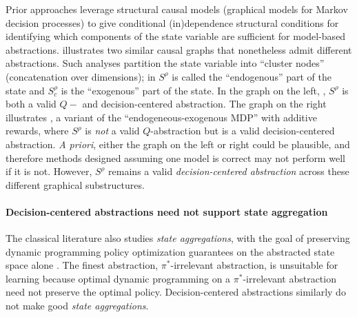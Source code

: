 \documentclass[opre,nonblindrev]{informs4}
\newenvironment{revision}{\begingroup\color{revisionblue}\ignorespaces}{\endgroup}
\begin{document}
\begin{revision}
Prior approaches leverage structural causal models (graphical models for Markov decision processes) to give conditional (in)dependence structural conditions for identifying which components of the state variable are sufficient for model-based abstractions.  illustrates two similar causal graphs that nonetheless admit different abstractions. Such analyses partition the state variable into ``cluster nodes'' (concatenation over dimensions); in  $S^\rho$ is called the ``endogenous'' part of the state and $S^\rho_c$ is the ``exogenous'' part of the state. In the graph on the left, \citet{zhou2024rewardrelevancefiltered},  $S^\rho$ is both a valid $Q-$ and decision-centered abstraction. The graph on the right illustrates \citep{pan2023learning}, a variant of the ``endogeneous-exogenous MDP''  \citet{dietterich2018discovering} with additive rewards, where $S^\rho$ is \textit{not} a valid $Q$-abstraction but is a valid decision-centered abstraction.
\textit{A priori}, either the graph on the left or right could be plausible, and therefore methods designed assuming one model is correct may not perform well if it is not. However, $S^\rho$ remains a valid \textit{decision-centered abstraction} across these different graphical substructures. 




\paragraph{Decision-centered abstractions need not support state aggregation} The classical literature also studies \textit{state aggregations}, with the goal of preserving dynamic programming policy optimization guarantees on the abstracted state space alone \citep{van2006performance,tsitsiklis1996feature,duan2019state}. The finest abstraction, $\pi^*$-irrelevant abstraction, is unsuitable for learning because optimal dynamic programming on a $\pi^*$-irrelevant abstraction need not preserve the optimal policy. Decision-centered abstractions similarly do not make good \textit{state aggregations}.


\end{revision}
\end{document}
